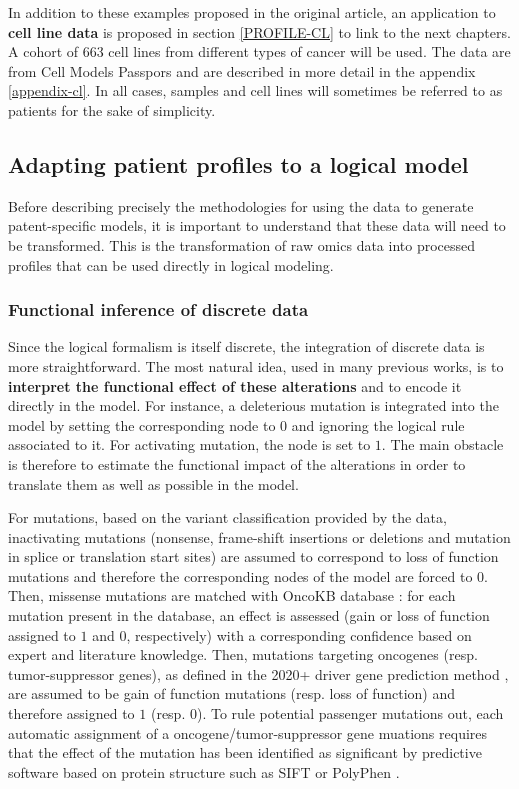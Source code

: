 \documentclass[a4paper,12pt,twoside,onecolumn,openright,final,oldfontcommands]{memoir}
\begin{document}
In addition to these examples proposed in the original article, an
application to \textbf{cell line data} is proposed in section
\ref{PROFILE-CL} to link to the next chapters. A cohort of 663 cell
lines from different types of cancer will be used. The data are from
Cell Models Passpors \citep[@][]{van2019cell} and are described in more
detail in the appendix \ref{appendix-cl}. In all cases, samples and cell
lines will sometimes be referred to as patients for the sake of
simplicity.

\subsection{Adapting patient profiles to a logical
model}\label{adapting-patient-profiles-to-a-logical-model}

Before describing precisely the methodologies for using the data to
generate patent-specific models, it is important to understand that
these data will need to be transformed. This is the transformation of
raw omics data into processed profiles that can be used directly in
logical modeling.

\subsubsection{Functional inference of discrete
data}\label{functional-inference-of-discrete-data}

Since the logical formalism is itself discrete, the integration of
discrete data is more straightforward. The most natural idea, used in
many previous works, is to \textbf{interpret the functional effect of
these alterations} and to encode it directly in the model. For instance,
a deleterious mutation is integrated into the model by setting the
corresponding node to \(0\) and ignoring the logical rule associated to
it. For activating mutation, the node is set to \(1\). The main obstacle
is therefore to estimate the functional impact of the alterations in
order to translate them as well as possible in the model.

For mutations, based on the variant classification provided by the data,
inactivating mutations (nonsense, frame-shift insertions or deletions
and mutation in splice or translation start sites) are assumed to
correspond to loss of function mutations and therefore the corresponding
nodes of the model are forced to \(0\). Then, missense mutations are
matched with OncoKB database \citep{chakravarty2017oncokb}: for each
mutation present in the database, an effect is assessed (gain or loss of
function assigned to \(1\) and \(0\), respectively) with a corresponding
confidence based on expert and literature knowledge. Then, mutations
targeting oncogenes (resp. tumor-suppressor genes), as defined in the
2020+ driver gene prediction method \citep{tokheim2016evaluating}, are
assumed to be gain of function mutations (resp. loss of function) and
therefore assigned to \(1\) (resp. \(0\)). To rule potential passenger
mutations out, each automatic assignment of a oncogene/tumor-suppressor
gene muations requires that the effect of the mutation has been
identified as significant by predictive software based on protein
structure such as SIFT \citep{kumar2009predicting} or PolyPhen
\citep{adzhubei2010method}.
\end{document}
